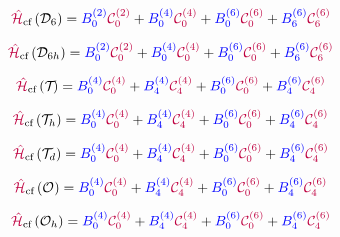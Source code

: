 \begin{equation}
\hamCrystalFieldSymbol\left(\groupSymbol{D}{6}\right)  = \Bkq{2}{0} \Ckq{2}{0} + 
 \Bkq{4}{0} \Ckq{4}{0} + 
 \Bkq{6}{0} \Ckq{6}{0} + 
 \Bkq{6}{6} \Ckq{6}{6}
\label{eqn:cf:D6}
\end{equation}


\begin{equation}
\hamCrystalFieldSymbol\left(\groupSymbol{D}{6h}\right)  = \Bkq{2}{0} \Ckq{2}{0} + 
 \Bkq{4}{0} \Ckq{4}{0} + 
 \Bkq{6}{0} \Ckq{6}{0} + 
 \Bkq{6}{6} \Ckq{6}{6}
\label{eqn:cf:D6h}
\end{equation}


\begin{equation}
\hamCrystalFieldSymbol\left(\groupSymbol{T}{ }\right)  = \Bkq{4}{0} \Ckq{4}{0} + 
 \Bkq{4}{4} \Ckq{4}{4} + 
 \Bkq{6}{0} \Ckq{6}{0} + 
 \Bkq{6}{4} \Ckq{6}{4}
\label{eqn:cf:T}
\end{equation}


\begin{equation}
\hamCrystalFieldSymbol\left(\groupSymbol{T}{h}\right)  = \Bkq{4}{0} \Ckq{4}{0} + 
 \Bkq{4}{4} \Ckq{4}{4} + 
 \Bkq{6}{0} \Ckq{6}{0} + 
 \Bkq{6}{4} \Ckq{6}{4}
\label{eqn:cf:Th}
\end{equation}


\begin{equation}
\hamCrystalFieldSymbol\left(\groupSymbol{T}{d}\right)  = \Bkq{4}{0} \Ckq{4}{0} + 
 \Bkq{4}{4} \Ckq{4}{4} + 
 \Bkq{6}{0} \Ckq{6}{0} + 
 \Bkq{6}{4} \Ckq{6}{4}
\label{eqn:cf:Td}
\end{equation}


\begin{equation}
\hamCrystalFieldSymbol\left(\groupSymbol{O}{ }\right)  = \Bkq{4}{0} \Ckq{4}{0} + 
 \Bkq{4}{4} \Ckq{4}{4} + 
 \Bkq{6}{0} \Ckq{6}{0} + 
 \Bkq{6}{4} \Ckq{6}{4}
\label{eqn:cf:O}
\end{equation}


\begin{equation}
\hamCrystalFieldSymbol\left(\groupSymbol{O}{h}\right)  = \Bkq{4}{0} \Ckq{4}{0} + 
 \Bkq{4}{4} \Ckq{4}{4} + 
 \Bkq{6}{0} \Ckq{6}{0} + 
 \Bkq{6}{4} \Ckq{6}{4}
\label{eqn:cf:Oh}
\end{equation}

